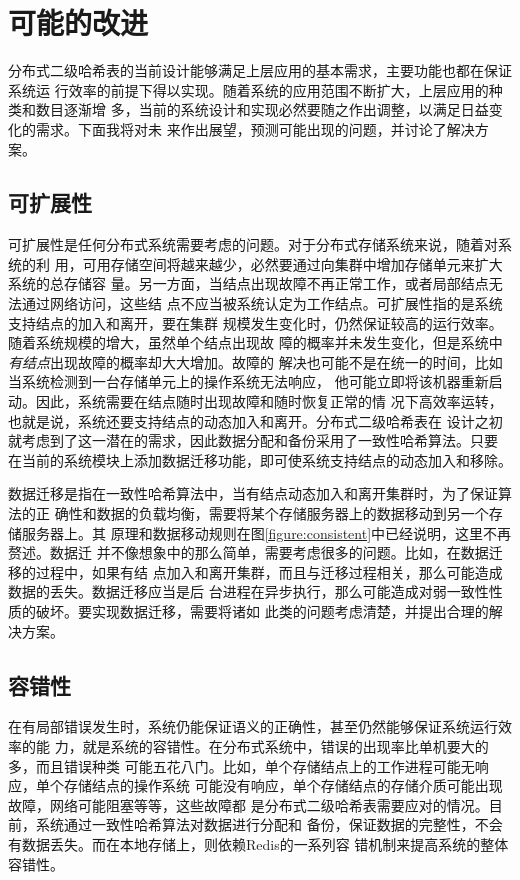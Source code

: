 \chapter{可能的改进}\label{chapter:future}
分布式二级哈希表的当前设计能够满足上层应用的基本需求，主要功能也都在保证系统运
行效率的前提下得以实现。随着系统的应用范围不断扩大，上层应用的种类和数目逐渐增
多，当前的系统设计和实现必然要随之作出调整，以满足日益变化的需求。下面我将对未
来作出展望，预测可能出现的问题，并讨论了解决方案。

\section{可扩展性}
可扩展性是任何分布式系统需要考虑的问题。对于分布式存储系统来说，随着对系统的利
用，可用存储空间将越来越少，必然要通过向集群中增加存储单元来扩大系统的总存储容
量。另一方面，当结点出现故障不再正常工作，或者局部结点无法通过网络访问，这些结
点不应当被系统认定为工作结点。可扩展性指的是系统支持结点的加入和离开，要在集群
规模发生变化时，仍然保证较高的运行效率。随着系统规模的增大，虽然单个结点出现故
障的概率并未发生变化，但是系统中\emph{有结点}出现故障的概率却大大增加。故障的
解决也可能不是在统一的时间，比如当系统检测到一台存储单元上的操作系统无法响应，
他可能立即将该机器重新启动。因此，系统需要在结点随时出现故障和随时恢复正常的情
况下高效率运转，也就是说，系统还要支持结点的动态加入和离开。分布式二级哈希表在
设计之初就考虑到了这一潜在的需求，因此数据分配和备份采用了一致性哈希算法。只要
在当前的系统模块上添加数据迁移功能，即可使系统支持结点的动态加入和移除。

数据迁移是指在一致性哈希算法中，当有结点动态加入和离开集群时，为了保证算法的正
确性和数据的负载均衡，需要将某个存储服务器上的数据移动到另一个存储服务器上。其
原理和数据移动规则在图\ref{figure:consistent}中已经说明，这里不再赘述。数据迁
并不像想象中的那么简单，需要考虑很多的问题。比如，在数据迁移的过程中，如果有结
点加入和离开集群，而且与迁移过程相关，那么可能造成数据的丢失。数据迁移应当是后
台进程在异步执行，那么可能造成对弱一致性性质的破坏。要实现数据迁移，需要将诸如
此类的问题考虑清楚，并提出合理的解决方案。

\section{容错性}
在有局部错误发生时，系统仍能保证语义的正确性，甚至仍然能够保证系统运行效率的能
力，就是系统的容错性。在分布式系统中，错误的出现率比单机要大的多，而且错误种类
可能五花八门。比如，单个存储结点上的工作进程可能无响应，单个存储结点的操作系统
可能没有响应，单个存储结点的存储介质可能出现故障，网络可能阻塞等等，这些故障都
是分布式二级哈希表需要应对的情况。目前，系统通过一致性哈希算法对数据进行分配和
备份，保证数据的完整性，不会有数据丢失。而在本地存储上，则依赖Redis的一系列容
错机制来提高系统的整体容错性。

